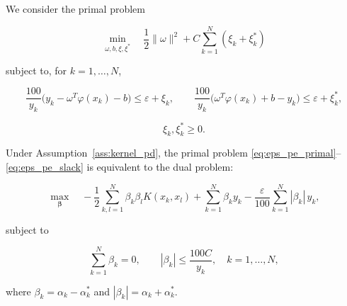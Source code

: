 \documentclass[mathematics,article,submit,pdftex,moreauthors]{Definitions/mdpi}
\begin{document}
We consider the primal problem
\begin{linenomath}
\begin{equation}\label{eq:eps_pe_primal}
\min_{\omega,b,\xi,\xi^*}
\quad
\frac{1}{2}\|\omega\|^2 + C \sum_{k=1}^N(\xi_k+\xi_k^*)
\end{equation}
\end{linenomath}
subject to, for $k=1,\dots,N$,
\begin{linenomath}
\begin{equation}\label{eq:eps_pe_constraints}
\frac{100}{y_k}\bigl(y_k - \omega^T\varphi(x_k) - b\bigr) \le \varepsilon + \xi_k,
\qquad
\frac{100}{y_k}\bigl(\omega^T\varphi(x_k) + b - y_k\bigr) \le \varepsilon + \xi_k^*,
\end{equation}
\end{linenomath}
\begin{linenomath}
\begin{equation}\label{eq:eps_pe_slack}
\xi_k,\xi_k^*\ge 0.
\end{equation}
\end{linenomath}

\begin{Theorem}\label{thm:eps_mape_dual}
Under Assumption~\ref{ass:kernel_pd}, the primal problem \eqref{eq:eps_pe_primal}--\eqref{eq:eps_pe_slack} 
is equivalent to the dual problem:
\begin{linenomath}
\begin{equation}\label{eq:eps_pe_dual}
\max_{\boldsymbol{\beta}}
\quad
-\frac{1}{2}\sum_{k,l=1}^N \beta_k\beta_l K(x_k,x_l)
+\sum_{k=1}^N \beta_k y_k
-\frac{\varepsilon}{100}\sum_{k=1}^N |\beta_k|\,y_k,
\end{equation}
\end{linenomath}
subject to
\begin{linenomath}
\begin{equation}\label{eq:eps_pe_dual_constraints}
\sum_{k=1}^N \beta_k=0,
\qquad
|\beta_k| \le \frac{100C}{y_k}, \quad k=1,\ldots,N,
\end{equation}
\end{linenomath}
where $\beta_k=\alpha_k-\alpha_k^*$ and $|\beta_k|=\alpha_k+\alpha_k^*$.
\end{Theorem}
\end{document}
